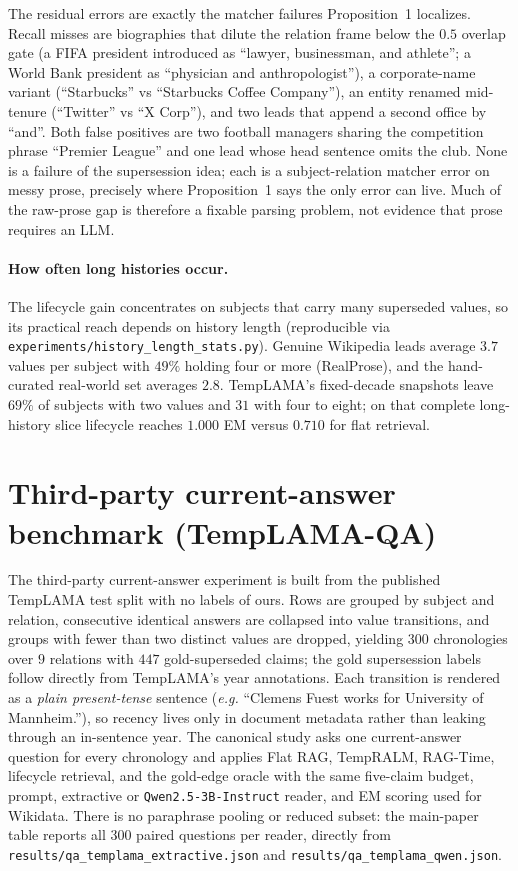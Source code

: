 \documentclass[letterpaper]{article}
\newcommand{\eg}{\emph{e.g.}}
\begin{document}
The residual errors are exactly the matcher failures Proposition~1 localizes. Recall misses are biographies that dilute the relation frame below the $0.5$ overlap gate (a FIFA president introduced as ``lawyer, businessman, and athlete''; a World Bank president as ``physician and anthropologist''), a corporate-name variant (``Starbucks'' vs ``Starbucks Coffee Company''), an entity renamed mid-tenure (``Twitter'' vs ``X Corp''), and two leads that append a second office by ``and''. Both false positives are two football managers sharing the competition phrase ``Premier League'' and one lead whose head sentence omits the club. None is a failure of the supersession idea; each is a subject-relation matcher error on messy prose, precisely where Proposition~1 says the only error can live. Much of the raw-prose gap is therefore a fixable parsing problem, not evidence that prose requires an LLM.

\paragraph{How often long histories occur.} The lifecycle gain concentrates on subjects that carry many superseded values, so its practical reach depends on history length (reproducible via \texttt{experiments/history\_length\_stats.py}). Genuine Wikipedia leads average $3.7$ values per subject with $49\%$ holding four or more (RealProse), and the hand-curated real-world set averages $2.8$. TempLAMA's fixed-decade snapshots leave $69\%$ of subjects with two values and $31$ with four to eight; on that complete long-history slice lifecycle reaches $1.000$ EM versus $0.710$ for flat retrieval.

\section{Third-party current-answer benchmark (TempLAMA-QA)}
\label{sec:supp_templamaqa}
The third-party current-answer experiment is built from the published TempLAMA test split with no labels of ours. Rows are grouped by subject and relation, consecutive identical answers are collapsed into value transitions, and groups with fewer than two distinct values are dropped, yielding $300$ chronologies over $9$ relations with $447$ gold-superseded claims; the gold supersession labels follow directly from TempLAMA's year annotations. Each transition is rendered as a \emph{plain present-tense} sentence (\eg{} ``Clemens Fuest works for University of Mannheim.''), so recency lives only in document metadata rather than leaking through an in-sentence year. The canonical study asks one current-answer question for every chronology and applies Flat RAG, TempRALM, RAG-Time, lifecycle retrieval, and the gold-edge oracle with the same five-claim budget, prompt, extractive or \texttt{Qwen2.5-3B-Instruct} reader, and EM scoring used for Wikidata. There is no paraphrase pooling or reduced subset: the main-paper table reports all $300$ paired questions per reader, directly from \texttt{results/qa\_templama\_extractive.json} and \texttt{results/qa\_templama\_qwen.json}.
\end{document}
